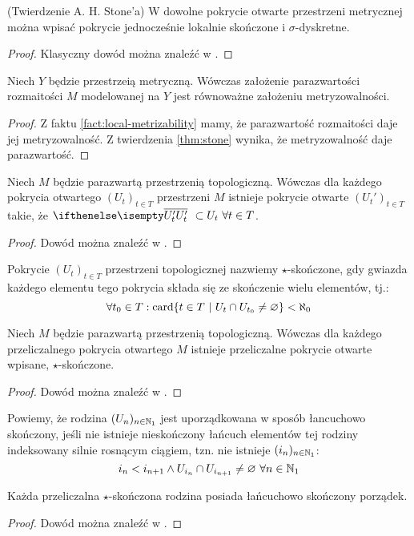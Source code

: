 \begin{thm}(Twierdzenie A. H. Stone'a)
  \label{thm:stone}
  W dowolne pokrycie otwarte przestrzeni metrycznej można wpisać pokrycie jednocześnie lokalnie skończone i $\sigma$-dyskretne.
  \begin{proof}
    Klasyczny dowód można znaleźć w \cite{eng}.
  \end{proof}
\end{thm}
 
\begin{cor}
  Niech $Y$ będzie przestrzeią metryczną. Wówczas założenie parazwartości rozmaitości $M$ modelowanej na $Y$ jest równoważne założeniu metryzowalności.
  \begin{proof}
    Z faktu \ref{fact:local-metrizability} mamy, że parazwartość rozmaitości daje jej metryzowalność. Z twierdzenia \ref{thm:stone} wynika, że metryzowalność daje parazwartość.
  \end{proof}
\end{cor}
 
\begin{lem} \label{lem:cl-refinement}
  Niech $M$ będzie parazwartą przestrzenią topologiczną. Wówczas dla każdego pokrycia otwartego $(U_t)_{t \in T}$ przestrzeni $M$ istnieje pokrycie otwarte $(U_t')_{t \in T}$ takie, że $\cl{U_t'}\ \subset U_t\ \forall t \in T$.
  \begin{proof}
    Dowód można znaleźć w \cite{eng}.
  \end{proof}
\end{lem}
 
\begin{df}
  Pokrycie $(U_t)_{t \in T}$ przestrzeni topologicznej nazwiemy $\star$-skończone, gdy gwiazda każdego elementu tego pokrycia składa się ze skończenie wielu elementów, tj.:
  \[
    \forall t_0 \in T: \operatorname{card}\{t \in T\ |\ U_t \cap U_{t_0} \neq \varnothing\} < \aleph_0
  \]
\end{df}
 
\begin{lem} \label{lem:star-finite}
  Niech $M$ będzie parazwartą przestrzenią topologiczną. Wówczas dla każdego przeliczalnego pokrycia otwartego $M$ istnieje przeliczalne pokrycie otwarte wpisane, $\star$-skończone.
  \begin{proof}
    Dowód można znaleźć w \cite{bp}.
  \end{proof}
\end{lem}
 
\begin{df}
  Powiemy, że rodzina $(U_n)_{n\in{\mathbb{N}_1}}$ jest uporządkowana w sposób łancuchowo skończony, jeśli nie istnieje nieskończony łańcuch elementów tej rodziny indeksowany silnie rosnącym ciągiem, tzn. nie istnieje $(i_n)_{n\in{\mathbb{N}_1}}$:
  \[
    i_n < i_{n+1} \wedge U_{i_n} \cap U_{i_{n+1}} \neq \varnothing\ \forall n\in{\mathbb{N}_1}
  \]
\end{df}
 
\begin{lem} \label{lem:chain-finite-order}
  Każda przeliczalna $\star$-skończona rodzina posiada łańcuchowo skończony porządek.
  \begin{proof}
    Dowód można znaleźć w \cite{bp}.
  \end{proof}
\end{lem}